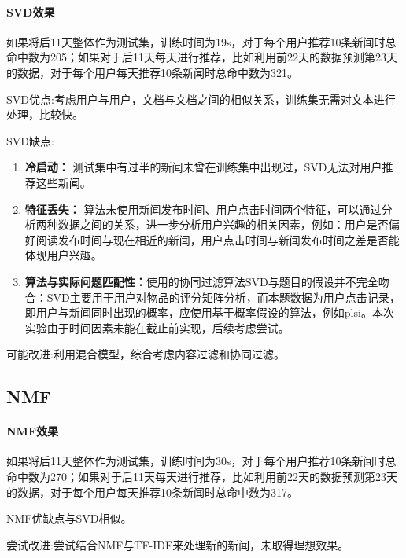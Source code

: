 \documentclass[UTF8]{article}
\begin{document}
\paragraph{SVD效果} 如果将后11天整体作为测试集，训练时间为19s，对于每个用户推荐10条新闻时总命中数为205；如果对于后11天每天进行推荐，比如利用前22天的数据预测第23天的数据，对于每个用户每天推荐10条新闻时总命中数为321。

SVD优点:考虑用户与用户，文档与文档之间的相似关系，训练集无需对文本进行处理，比较快。

SVD缺点: 
\begin{enumerate}
    \item \textbf{冷启动：} 测试集中有过半的新闻未曾在训练集中出现过，SVD无法对用户推荐这些新闻。
    \item \textbf{特征丢失：} 算法未使用新闻发布时间、用户点击时间两个特征，可以通过分析两种数据之间的关系，进一步分析用户兴趣的相关因素，例如：用户是否偏好阅读发布时间与现在相近的新闻，用户点击时间与新闻发布时间之差是否能体现用户兴趣。
    \item \textbf{算法与实际问题匹配性：}使用的协同过滤算法SVD与题目的假设并不完全吻合：SVD主要用于用户对物品的评分矩阵分析，而本题数据为用户点击记录，即用户与新闻同时出现的概率，应使用基于概率假设的算法，例如plsi。本次实验由于时间因素未能在截止前实现，后续考虑尝试。
\end{enumerate}
可能改进:利用混合模型，综合考虑内容过滤和协同过滤。
\subsection{NMF}
\paragraph{NMF效果} 如果将后11天整体作为测试集，训练时间为30s，对于每个用户推荐10条新闻时总命中数为270；如果对于后11天每天进行推荐，比如利用前22天的数据预测第23天的数据，对于每个用户每天推荐10条新闻时总命中数为317。

NMF优缺点与SVD相似。

尝试改进:尝试结合NMF与TF-IDF来处理新的新闻，未取得理想效果。
\end{document}
